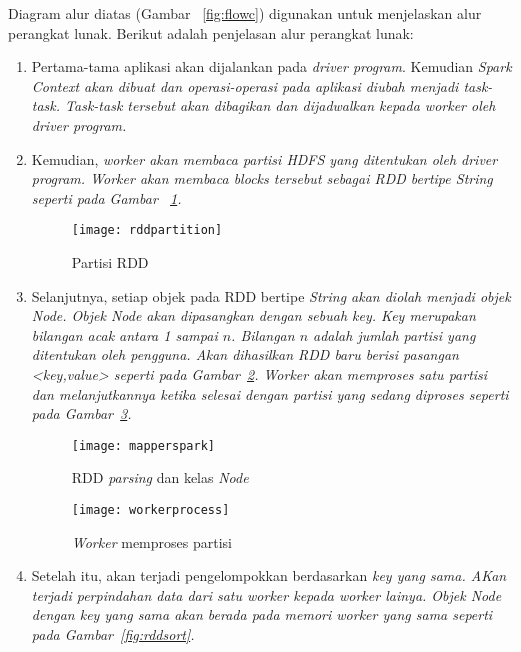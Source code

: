 Diagram alur diatas (Gambar ~\ref{fig:flowc}) digunakan untuk menjelaskan alur perangkat lunak. Berikut adalah penjelasan alur perangkat lunak:

\begin{enumerate}

\item Pertama-tama aplikasi akan dijalankan pada \textit{driver program}. Kemudian \it{Spark Context} akan dibuat dan operasi-operasi pada aplikasi diubah menjadi \it{task-task}. \it{Task-task} tersebut akan dibagikan dan dijadwalkan kepada \it{worker} oleh \it{driver program}. 


\item Kemudian, \it{worker} akan membaca partisi HDFS yang ditentukan oleh \it{driver program}. \it{Worker} akan membaca \it{blocks} tersebut sebagai RDD bertipe String seperti pada Gambar ~\ref{fig:rddpartition}. 

\begin{figure}[H]
    \centering  
    \texttt{[image: rddpartition]}  
    \caption[Partisi RDD]{Partisi RDD} 
    \label{fig:rddpartition} 
\end{figure}

\item Selanjutnya, setiap objek pada RDD bertipe \it{String} akan diolah menjadi objek \it{Node}. Objek \it{Node} akan dipasangkan dengan sebuah \it{key}. \it{Key} merupakan bilangan acak antara 1 sampai $n$. Bilangan $n$ adalah jumlah partisi yang ditentukan oleh pengguna. Akan dihasilkan RDD baru berisi pasangan <\it{key},\it{value}> seperti pada Gambar~\ref{fig:mapperspark}. \it{Worker} akan memproses satu partisi dan melanjutkannya ketika selesai dengan partisi yang sedang diproses seperti pada Gambar~\ref{fig:workerprocess}.

\begin{figure}[H]
    \centering  
    \texttt{[image: mapperspark]}  
    \caption[RDD \textit{parsing} dan kelas \textit{Node}]{RDD \textit{parsing} dan kelas \textit{Node}} 
    \label{fig:mapperspark}
\end{figure}

\begin{figure}[H]
    \centering  
    \texttt{[image: workerprocess]}  
    \caption[\textit{Worker} memproses partisi]{\textit{Worker} memproses partisi} 
    \label{fig:workerprocess} 
\end{figure}


\item Setelah itu, akan terjadi pengelompokkan berdasarkan \it{key} yang sama. AKan terjadi perpindahan data dari satu \it{worker} kepada \it{worker} lainya. Objek \it{Node} dengan \it{key} yang sama akan berada pada memori \it{worker} yang sama seperti pada Gambar~\ref{fig:rddsort}.


\end{enumerate}
